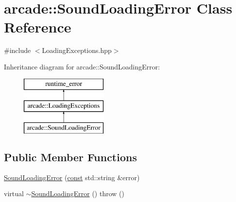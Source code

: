 \hypertarget{classarcade_1_1_sound_loading_error}{\section{arcade\-:\-:Sound\-Loading\-Error Class Reference}
\label{classarcade_1_1_sound_loading_error}
}


{\ttfamily \#include $<$Loading\-Exceptions.\-hpp$>$}

Inheritance diagram for arcade\-:\-:Sound\-Loading\-Error\-:\begin{figure}[H]
\begin{center}
\leavevmode
\includegraphics[height=3.000000cm]{classarcade_1_1_sound_loading_error}
\end{center}
\end{figure}
\subsection*{Public Member Functions}
\begin{DoxyCompactItemize}
\item 
\hyperlink{classarcade_1_1_sound_loading_error_a2aaaa439abead31d07b966187146b9a2}{Sound\-Loading\-Error} (\hyperlink{term__entry_8h_a57bd63ce7f9a353488880e3de6692d5a}{const} std\-::string \&error)
\item 
virtual \hyperlink{classarcade_1_1_sound_loading_error_acfbe834e6aa9f675339bbaba04ded437}{$\sim$\-Sound\-Loading\-Error} ()  throw ()
\end{DoxyCompactItemize}


